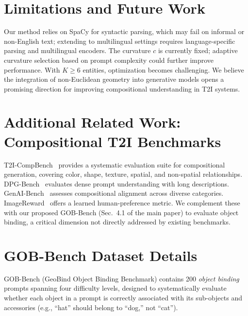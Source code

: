 \documentclass[sigconf,nonacm]{acmart}
\begin{document}
\section{Limitations and Future Work}
\label{sec:limitations}

Our method relies on SpaCy for syntactic parsing, which may fail on informal or non-English text; extending to multilingual settings requires language-specific parsing and multilingual encoders. The curvature $c$ is currently fixed; adaptive curvature selection based on prompt complexity could further improve performance. With $K \geq 6$ entities, optimization becomes challenging. We believe the integration of non-Euclidean geometry into generative models opens a promising direction for improving compositional understanding in T2I systems.

\section{Additional Related Work: Compositional T2I Benchmarks}
\label{sec:related_benchmarks}

T2I-CompBench~\cite{huang2023t2icompbench} provides a systematic evaluation suite for compositional generation, covering color, shape, texture, spatial, and non-spatial relationships. DPG-Bench~\cite{hu2024ella} evaluates dense prompt understanding with long descriptions. GenAI-Bench~\cite{li2024genaibench} assesses compositional alignment across diverse categories. ImageReward~\cite{xu2024imagereward} offers a learned human-preference metric. We complement these with our proposed GOB-Bench (Sec.~4.1 of the main paper) to evaluate object binding, a critical dimension not directly addressed by existing benchmarks.

\section{GOB-Bench Dataset Details}
\label{sec:gobbench}

\setcounter{table}{0}

GOB-Bench (GeoBind Object Binding Benchmark) contains 200 \emph{object binding} prompts spanning four difficulty levels, designed to systematically evaluate whether each object in a prompt is correctly associated with its sub-objects and accessories (e.g., ``hat'' should belong to ``dog,'' not ``cat'').
\end{document}
